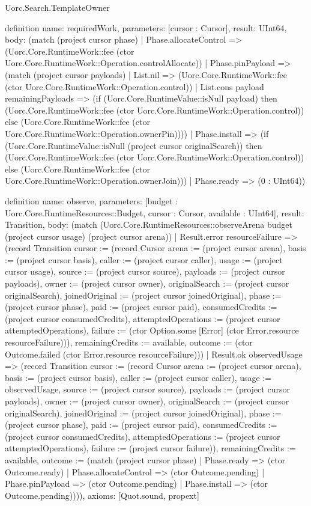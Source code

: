 \begin{lexlean}{Uorc.Search.TemplateOwner}
\begin{semanticmodule}
definition{
  name: requiredWork,
  parameters: [cursor : Cursor],
  result: UInt64,
  body: (match (project cursor phase)
    | Phase.allocateControl => (Uorc.Core.RuntimeWork::fee (ctor Uorc.Core.RuntimeWork::Operation.controlAllocate))
    | Phase.pinPayload => (match (project cursor payloads)
      | List.nil => (Uorc.Core.RuntimeWork::fee (ctor Uorc.Core.RuntimeWork::Operation.control))
      | List.cons payload remainingPayloads => (if (Uorc.Core.RuntimeValue::isNull payload) then (Uorc.Core.RuntimeWork::fee (ctor Uorc.Core.RuntimeWork::Operation.control)) else (Uorc.Core.RuntimeWork::fee (ctor Uorc.Core.RuntimeWork::Operation.ownerPin))))
    | Phase.install => (if (Uorc.Core.RuntimeValue::isNull (project cursor originalSearch)) then (Uorc.Core.RuntimeWork::fee (ctor Uorc.Core.RuntimeWork::Operation.control)) else (Uorc.Core.RuntimeWork::fee (ctor Uorc.Core.RuntimeWork::Operation.ownerJoin)))
    | Phase.ready => (0 : UInt64))
}

definition{
  name: observe,
  parameters: [budget : Uorc.Core.RuntimeResources::Budget, cursor : Cursor, available : UInt64],
  result: Transition,
  body: (match (Uorc.Core.RuntimeResources::observeArena budget (project cursor usage) (project cursor arena))
    | Result.error resourceFailure => (record Transition {cursor := (record Cursor {arena := (project cursor arena), basis := (project cursor basis), caller := (project cursor caller), usage := (project cursor usage), source := (project cursor source), payloads := (project cursor payloads), owner := (project cursor owner), originalSearch := (project cursor originalSearch), joinedOriginal := (project cursor joinedOriginal), phase := (project cursor phase), paid := (project cursor paid), consumedCredits := (project cursor consumedCredits), attemptedOperations := (project cursor attemptedOperations), failure := (ctor Option.some [Error] (ctor Error.resource resourceFailure))}), remainingCredits := available, outcome := (ctor Outcome.failed (ctor Error.resource resourceFailure))})
    | Result.ok observedUsage => (record Transition {cursor := (record Cursor {arena := (project cursor arena), basis := (project cursor basis), caller := (project cursor caller), usage := observedUsage, source := (project cursor source), payloads := (project cursor payloads), owner := (project cursor owner), originalSearch := (project cursor originalSearch), joinedOriginal := (project cursor joinedOriginal), phase := (project cursor phase), paid := (project cursor paid), consumedCredits := (project cursor consumedCredits), attemptedOperations := (project cursor attemptedOperations), failure := (project cursor failure)}), remainingCredits := available, outcome := (match (project cursor phase)
      | Phase.ready => (ctor Outcome.ready)
      | Phase.allocateControl => (ctor Outcome.pending)
      | Phase.pinPayload => (ctor Outcome.pending)
      | Phase.install => (ctor Outcome.pending))})),
  axioms: [Quot.sound, propext]
}


\end{semanticmodule}
\end{lexlean}
